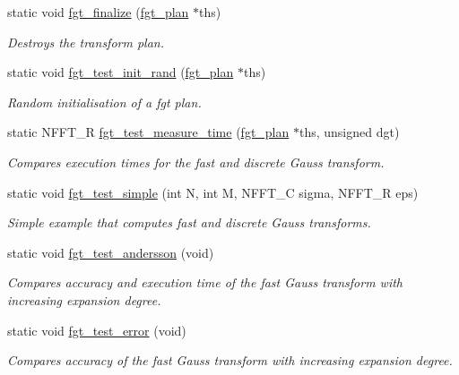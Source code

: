 \begin{DoxyCompactItemize}
static void \hyperlink{group__applications__fastgauss_ga9cae69a3f335aa5090c3a4d2688443c7}{fgt\-\_\-finalize} (\hyperlink{structfgt__plan}{fgt\-\_\-plan} $\ast$ths)
\begin{DoxyCompactList}\small\item\em Destroys the transform plan. \end{DoxyCompactList}\item 
static void \hyperlink{group__applications__fastgauss_ga24493778cd9dc1855afd567fd3010030}{fgt\-\_\-test\-\_\-init\-\_\-rand} (\hyperlink{structfgt__plan}{fgt\-\_\-plan} $\ast$ths)
\begin{DoxyCompactList}\small\item\em Random initialisation of a fgt plan. \end{DoxyCompactList}\item 
static N\-F\-F\-T\-\_\-\-R \hyperlink{group__applications__fastgauss_ga82e0ed5a648e814157d2c7d3ba1d1c0f}{fgt\-\_\-test\-\_\-measure\-\_\-time} (\hyperlink{structfgt__plan}{fgt\-\_\-plan} $\ast$ths, unsigned dgt)
\begin{DoxyCompactList}\small\item\em Compares execution times for the fast and discrete Gauss transform. \end{DoxyCompactList}\item 
static void \hyperlink{group__applications__fastgauss_ga21bcb178a949b979dd20d53e24507e3f}{fgt\-\_\-test\-\_\-simple} (int N, int M, N\-F\-F\-T\-\_\-\-C sigma, N\-F\-F\-T\-\_\-\-R eps)
\begin{DoxyCompactList}\small\item\em Simple example that computes fast and discrete Gauss transforms. \end{DoxyCompactList}\item 
static void \hyperlink{group__applications__fastgauss_ga922f4938e27bde7ae9e8614a74a509bd}{fgt\-\_\-test\-\_\-andersson} (void)
\begin{DoxyCompactList}\small\item\em Compares accuracy and execution time of the fast Gauss transform with increasing expansion degree. \end{DoxyCompactList}\item 
static void \hyperlink{group__applications__fastgauss_ga0cdcc40d87e8ee3141daebffbaf19619}{fgt\-\_\-test\-\_\-error} (void)
\begin{DoxyCompactList}\small\item\em Compares accuracy of the fast Gauss transform with increasing expansion degree. \end{DoxyCompactList}\item 

\end{DoxyCompactItemize}
